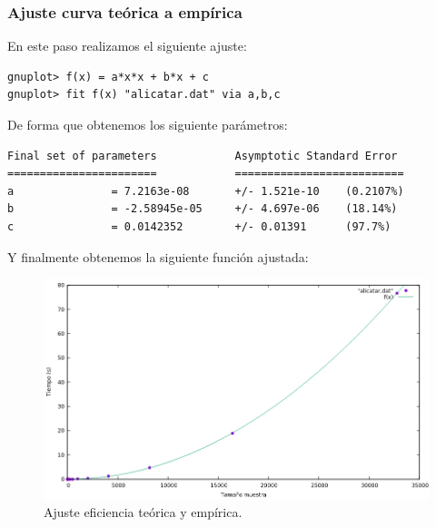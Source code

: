 \subsubsection{Ajuste curva teórica a empírica}

En este paso realizamos el siguiente ajuste:
\begin{shaded*}
\begin{verbatim}
gnuplot> f(x) = a*x*x + b*x + c
gnuplot> fit f(x) "alicatar.dat" via a,b,c

\end{verbatim}
\end{shaded*}

De forma que obtenemos los siguiente parámetros:

\begin{shaded*}
\begin{verbatim}
Final set of parameters            Asymptotic Standard Error
=======================            ==========================
a               = 7.2163e-08       +/- 1.521e-10    (0.2107%)
b               = -2.58945e-05     +/- 4.697e-06    (18.14%)
c               = 0.0142352        +/- 0.01391      (97.7%)

\end{verbatim}
\end{shaded*}

Y finalmente obtenemos la siguiente función ajustada:
\begin{figure}[H]
    \begin{center}
        \includegraphics[scale=0.7]{imagenes/a_adj.png}
        \caption{Ajuste eficiencia teórica y empírica.}
        \label{fig13}
    \end{center}
\end{figure}


\newpage


